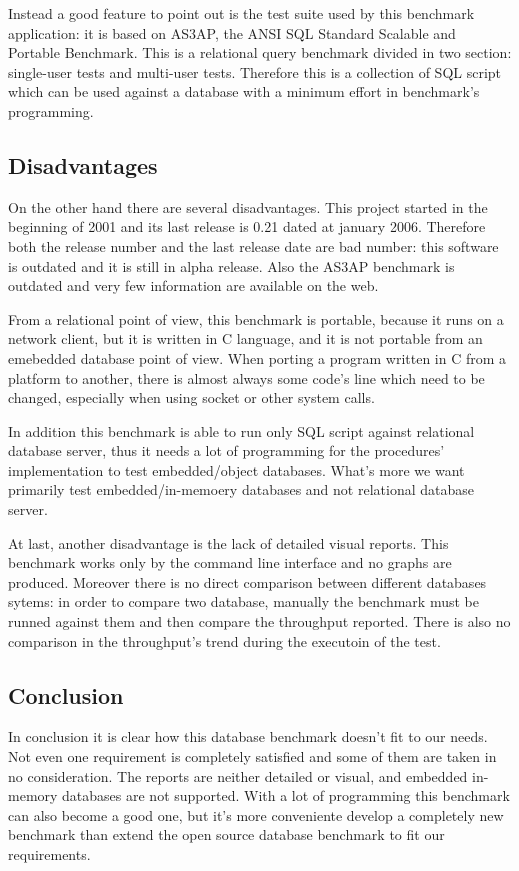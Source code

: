 Instead a good feature to point out is the test suite used by this benchmark application: it is based on AS3AP, the ANSI SQL Standard Scalable and Portable Benchmark. This is a relational query benchmark divided in two section: single-user tests and multi-user tests. Therefore this is a collection of SQL script which can be used against a database with a minimum effort in benchmark's programming. 

		\subsection{Disadvantages}
On the other hand there are several disadvantages. This project started in the beginning of 2001 and its last release is 0.21 dated at january 2006. Therefore both the release number and the last release date are bad number: this software is outdated and it is still in alpha release. Also the AS3AP benchmark is outdated and very few information are available on the web.

From a relational point of view, this benchmark is portable, because it runs on a network client, but it is written in C language, and it is not portable from an emebedded database point of view. When porting a program written in C from a platform to another, there is almost always some code's line which need to be changed, especially when using socket or other system calls.

In addition this benchmark is able to run only SQL script against relational database server, thus it needs a lot of programming for the procedures' implementation to test embedded/object databases. What's more we want primarily test embedded/in-memoery databases and not relational database server.

At last, another disadvantage is the lack of detailed visual reports. This benchmark works only by the command line interface and no graphs are produced. Moreover there is no direct comparison between different databases sytems: in order to compare two database, manually the benchmark must be runned against them and then compare the throughput reported. There is also no comparison in the throughput's trend during the executoin of the test.

		\subsection{Conclusion}
In conclusion it is clear how this database benchmark doesn't fit to our needs. Not even one requirement is completely satisfied and some of them are taken in no consideration. The reports are neither detailed or visual, and embedded in-memory databases are not supported. With a lot of programming this benchmark can also become a good one, but it's more conveniente develop a completely new benchmark than extend the open source database benchmark to fit our requirements.

